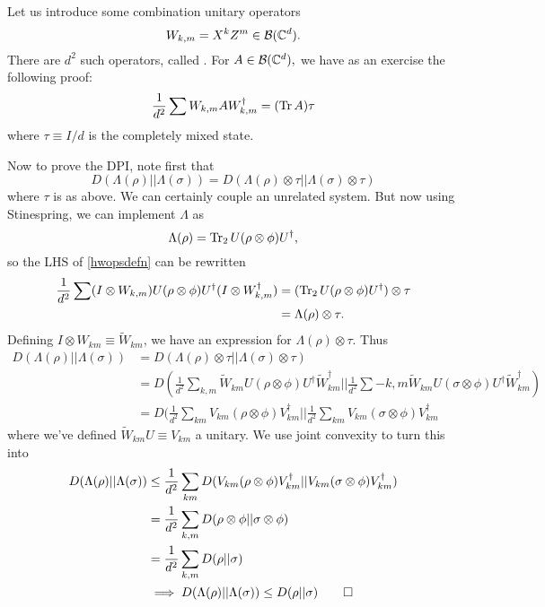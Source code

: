 Let us introduce some combination unitary operators
\begin{equation}
    W_{k,m}=X^k Z^m \in \mathcal{B}(\mathbb{C}^d).
\end{equation}
There are $d^2$ such operators, called . For $A\in \mathcal{B}(\mathbb{C}^d),$ we have as an exercise the following proof:
\begin{equation}\label{hwopsdefn}
    \frac{1}{d^2} \sum W_{k,m} A W_{k,m}^\dagger = (\operatorname{Tr} A) \tau
\end{equation}
where $\tau \equiv I/d$ is the completely mixed state.

Now to prove the DPI, note first that
\begin{equation}
    D(\Lambda(\rho)||\Lambda(\sigma)) = D(\Lambda(\rho)\otimes \tau|| \Lambda(\sigma) \otimes \tau)
\end{equation}
where $\tau$ is as above. We can certainly couple an unrelated system. But now using Stinespring, we can implement $\Lambda$ as
\begin{equation}
    \Lambda(\rho)= \operatorname{Tr}_2 U(\rho\otimes \phi)U^\dagger,
\end{equation}
so the LHS of \ref{hwopsdefn} can be rewritten
\begin{align*}
    \frac{1}{d^2} \sum (I\otimes W_{k,m}) U(\rho \otimes \phi) U^\dagger (I\otimes W_{k,m}^\dagger) &= (\operatorname{Tr}_2 U(\rho \otimes \phi) U^\dagger) \otimes \tau\\
    &= \Lambda(\rho) \otimes \tau.
\end{align*}
Defining $I\otimes W_{km} \equiv \tilde W_{km}$, we have an expression for $\Lambda(\rho)\otimes \tau$. Thus
\begin{align}
    D(\Lambda(\rho)||\Lambda(\sigma)) &= D(\Lambda(\rho) \otimes \tau ||\Lambda(\sigma) \otimes \tau)\\
    &= D(\frac{1}{d^2} \sum_{k,m} \tilde W_{km} U(\rho\otimes \phi) U^\dagger \tilde W_{km}^\dagger || \frac{1}{d^2} \sum-{k,m} \tilde W_{km}U (\sigma \otimes \phi) U^\dagger \tilde W_{km}^\dagger)\\
    &= D(\frac{1}{d^2} \sum_{km} V_{km}(\rho \otimes \phi) V_{km}^\dagger || \frac{1}{d^2} \sum_{km} V_{km}(\sigma \otimes \phi) V_{km}^\dagger
\end{align}
where we've defined $\tilde W_{km} U \equiv V_{km}$ a unitary. We use joint convexity to turn this into
\begin{align*}
    D(\Lambda(\rho)||\Lambda(\sigma)) &\leq \frac{1}{d^2} \sum_{km} D(V_{km}(\rho\otimes \phi)V_{km}^\dagger || V_{km}(\sigma\otimes \phi)V_{km}^\dagger)\\
    &= \frac{1}{d^2} \sum_{k,m} D(\rho\otimes \phi|| \sigma \otimes \phi)\\
    &= \frac{1}{d^2} \sum_{k,m} D(\rho||\sigma)\\
    &\implies D(\Lambda(\rho)||\Lambda(\sigma)) \leq D(\rho||\sigma) \qed
\end{align*}

